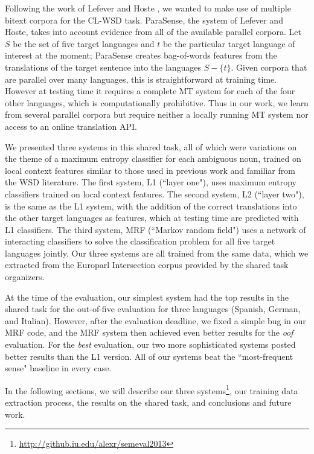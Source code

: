 \documentclass[11pt,letterpaper]{article}
\begin{document}
Following the work of Lefever and Hoste
, we wanted to make use of
multiple bitext corpora for the CL-WSD task.  ParaSense, the system of Lefever
and Hoste, takes into account evidence from all of the available parallel
corpora. Let $S$ be the set of five target languages and $t$ be the particular
target language of interest at the moment; ParaSense creates bag-of-words
features from the translations of the target sentence into the languages $S -
\lbrace{t \rbrace}$. Given corpora that are parallel over many languages, this
is straightforward at training time. However at testing time it requires a
complete MT system for each of the four other languages, which is
computationally prohibitive. Thus in our work, we learn from several parallel
corpora but require neither a locally running MT system nor access to an online
translation API.

We presented three systems in this shared task, all of which were variations on
the theme of a maximum entropy classifier for each ambiguous noun, trained on
local context features similar to those used in previous work and familiar from
the WSD literature. The first system, L1 (``layer one"), uses maximum entropy
classifiers trained on local context features. The second system, L2 (``layer
two"), is the same as the L1 system, with the addition of the correct
translations into the other target languages as features, which at testing time
are predicted with L1 classifiers. The third system, MRF (``Markov random
field") uses a network of interacting classifiers to solve the classification
problem for all five target languages jointly. Our three systems are all
trained from the same data, which we extracted from the Europarl Intersection
corpus provided by the shared task organizers.

At the time of the evaluation, our simplest system had the top results in the
shared task for the out-of-five evaluation for three languages (Spanish,
German, and Italian).  However, after the evaluation deadline, we fixed a
simple bug in our MRF code, and the MRF system then achieved even better
results for the \emph{oof} evaluation. For the \emph{best} evaluation, our two
more sophisticated systems posted better results than the L1 version. All of
our systems beat the ``most-frequent sense" baseline in every case.

In the following sections, we will describe our three
systems\footnote{\url{http://github.iu.edu/alexr/semeval2013}}, our training
data extraction process, the results on the shared task, and conclusions and
future work.
\end{document}
